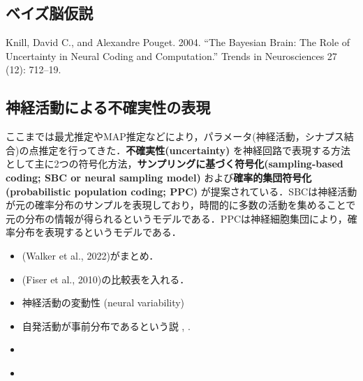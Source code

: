 \subsection{ベイズ脳仮説}
Knill, David C., and Alexandre Pouget. 2004. “The Bayesian Brain: The Role of Uncertainty in Neural Coding and Computation.” Trends in Neurosciences 27 (12): 712–19.
\subsection{神経活動による不確実性の表現}
ここまでは最尤推定やMAP推定などにより，パラメータ(神経活動，シナプス結合)の点推定を行ってきた．\textbf{不確実性(uncertainty)} を神経回路で表現する方法として主に2つの符号化方法，\textbf{サンプリングに基づく符号化(sampling-based coding; SBC or neural sampling model)} および\textbf{確率的集団符号化(probabilistic population coding; PPC)} が提案されている．SBCは神経活動が元の確率分布のサンプルを表現しており，時間的に多数の活動を集めることで元の分布の情報が得られるというモデルである．PPCは神経細胞集団により，確率分布を表現するというモデルである．
\begin{itemize}
\item (Walker et al., 2022)がまとめ．
\item (Fiser et al., 2010)の比較表を入れる．
\item 神経活動の変動性 (neural variability)
\item 自発活動が事前分布であるという説 \citep{Fiser2010-kw}, \citep{Berkes2011-it}.
\item \citep{Hoyer2002-ci}
\item \citep{Sanborn2016-en}
\end{itemize}
